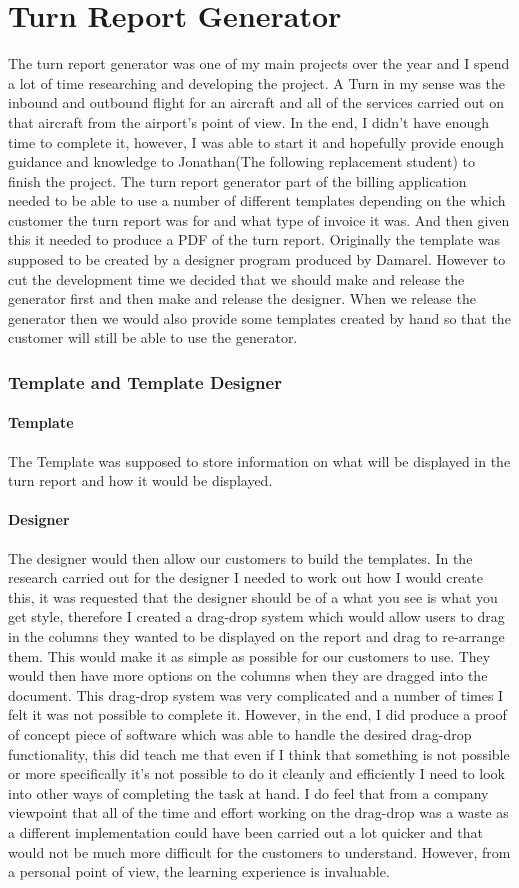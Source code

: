 \section{Turn Report Generator}{
	The turn report generator was one of my main projects over the year and I spend a lot of time researching and developing the project. A Turn in my sense was the inbound and outbound flight for an aircraft and all of the services carried out on that aircraft from the airport's point of view. In the end, I didn't have enough time to complete it, however, I was able to start it and hopefully provide enough guidance and knowledge to Jonathan(The following replacement student) to finish the project. The turn report generator part of the billing application needed to be able to use a number of different templates depending on the which customer the turn report was for and what type of invoice it was. And then given this it needed to produce a PDF of the turn report. Originally the template was supposed to be created by a designer program produced by Damarel. However to cut the development time we decided that we should make and release the generator first and then make and release the designer. When we release the generator then we would also provide some templates created by hand so that the customer will still be able to use the generator.
	\subsubsection*{Template and Template Designer}{
		\paragraph{Template}{The Template was supposed to store information on what will be displayed in the turn report and how it would be displayed.}
		\paragraph{Designer}{The designer would then allow our customers to build the templates. In the research carried out for the designer I needed to work out how I would create this, it was requested that the designer should be of a what you see is what you get style, therefore I created a drag-drop system which would allow users to drag in the columns they wanted to be displayed on the report and drag to re-arrange them. This would make it as simple as possible for our customers to use. They would then have more options on the columns when they are dragged into the document. This drag-drop system was very complicated and a number of times I felt it was not possible to complete it. However, in the end, I did produce a proof of concept piece of software which was able to handle the desired drag-drop functionality, this did teach me that even if I think that something is not possible or more specifically it's not possible to do it cleanly and efficiently I need to look into other ways of completing the task at hand. I do feel that from a company viewpoint that all of the time and effort working on the drag-drop was a waste as a different implementation could have been carried out a lot quicker and that would not be much more difficult for the customers to understand. However, from a personal point of view, the learning experience is invaluable.}
}}
